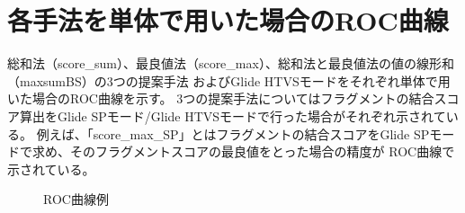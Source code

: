 \chapter{各手法を単体で用いた場合のROC曲線}\label{appendix:roc}
総和法（score\_sum）、最良値法（score\_max）、総和法と最良値法の値の線形和（maxsumBS）の3つの提案手法
およびGlide HTVSモードをそれぞれ単体で用いた場合のROC曲線を示す。
3つの提案手法についてはフラグメントの結合スコア算出をGlide SPモード/Glide HTVSモードで行った場合がそれぞれ示されている。
例えば、「score\_max\_SP」とはフラグメントの結合スコアをGlide SPモードで求め、そのフラグメントスコアの最良値をとった場合の精度が
ROC曲線で示されている。
\begin{figure}[tb]
 \begin{minipage}{0.5\hsize}
  \begin{center}
  \end{center}
 \end{minipage}
 \begin{minipage}{0.5\hsize}
  \begin{center}
  \end{center}
 \end{minipage}
 \begin{minipage}{0.5\hsize}
  \begin{center}
  \end{center}
 \end{minipage}
 \begin{minipage}{0.5\hsize}
  \begin{center}
  \end{center}
 \end{minipage}
 \begin{minipage}{0.5\hsize}
  \begin{center}
  \end{center}
 \end{minipage}
 \begin{minipage}{0.5\hsize}
  \begin{center}
  \end{center}
 \end{minipage}
  \caption{ROC曲線例}
  \label{fig:roc:1}
\end{figure}
